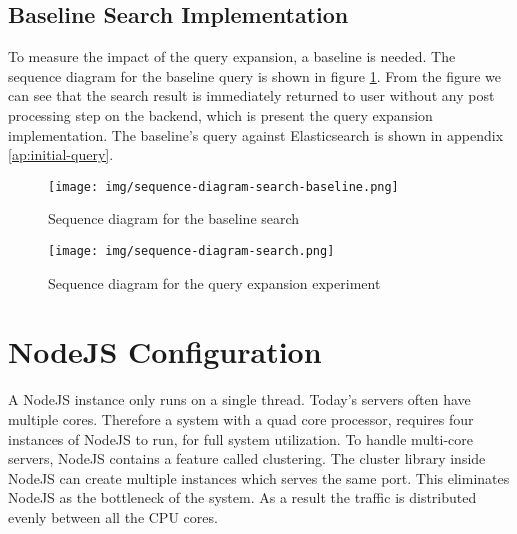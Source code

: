 \subsection{Baseline Search Implementation}
To measure the impact of the query expansion, a baseline is needed.
The sequence diagram for the baseline query is shown in figure \ref{fig:sequence-diagram-search-baseline}.
From the figure we can see that the search result is immediately returned to user without any post processing step on the backend,
which is present the query expansion implementation.
The baseline's query against Elasticsearch is shown in appendix \ref{ap:initial-query}.

\begin{figure}[h!]
\centering \texttt{[image: img/sequence-diagram-search-baseline.png]}
\caption{Sequence diagram for the baseline search}
\label{fig:sequence-diagram-search-baseline}
\end{figure}

\begin{figure}[h!]
\centering \texttt{[image: img/sequence-diagram-search.png]}
\caption{Sequence diagram for the query expansion experiment}
\label{fig:sequence-diagram-search}
\end{figure}

\section{NodeJS Configuration}
A NodeJS instance only runs on a single thread.
Today's servers often have multiple cores.
Therefore a system with a quad core processor, requires four instances of NodeJS to run, for full system utilization.
To handle multi-core servers, NodeJS contains a feature called clustering.
The cluster library inside NodeJS can create multiple instances which serves the same port.
This eliminates NodeJS as the bottleneck of the system.
As a result the traffic is distributed evenly between all the CPU cores.
